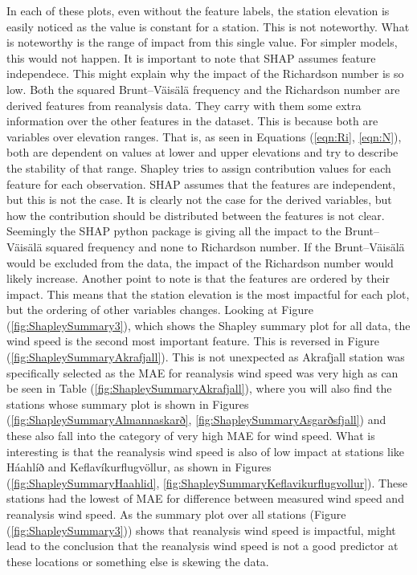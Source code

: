 In each of these plots, even without the feature labels, the station elevation is easily noticed as the value is constant for a station. This is not noteworthy. What is noteworthy is the range of impact from this single value. For simpler models, this would not happen. It is important to note that SHAP assumes feature independece\cite{Salih_2024}. This might explain why the impact of the Richardson number is so low. Both the squared Brunt–Väisälä frequency and the Richardson number are derived features from reanalysis data. They carry with them some extra information over the other features in the dataset. This is because both are variables over elevation ranges. That is, as seen in Equations (\ref{eqn:Ri}, \ref{eqn:N}), both are dependent on values at lower and upper elevations and try to describe the stability of that range. Shapley tries to assign contribution values for each feature for each observation. SHAP assumes that the features are independent, but this is not the case. It is clearly not the case for the derived variables, but how the contribution should be distributed between the features is not clear. Seemingly the SHAP python package is giving all the impact to the Brunt–Väisälä squared frequency and none to Richardson number. If the Brunt–Väisälä would be excluded from the data, the impact of the Richardson number would likely increase. Another point to note is that the features are ordered by their impact. This means that the station elevation is the most impactful for each plot, but the ordering of other variables changes. Looking at Figure (\ref{fig:ShapleySummary3}), which shows the Shapley summary plot for all data, the wind speed is the second most important feature. This is reversed in Figure (\ref{fig:ShapleySummaryAkrafjall}). This is not unexpected as Akrafjall station was specifically selected as the MAE for reanalysis wind speed was very high as can be seen in Table (\ref{fig:ShapleySummaryAkrafjall}), where you will also find the stations whose summary plot is shown in Figures (\ref{fig:ShapleySummaryAlmannaskarð}, \ref{fig:ShapleySummaryAsgarðsfjall}) and these also fall into the category of very high MAE for wind speed. What is interesting is that the reanalysis wind speed is also of low impact at stations like Háahlíð and Keflavíkurflugvöllur, as shown in Figures (\ref{fig:ShapleySummaryHaahlid}, \ref{fig:ShapleySummaryKeflavikurflugvollur}). These stations had the lowest of MAE for difference between measured wind speed and reanalysis wind speed. As the summary plot over all stations (Figure (\ref{fig:ShapleySummary3})) shows that reanalysis wind speed is impactful, might lead to the conclusion that the reanalysis wind speed is not a good predictor at these locations or something else is skewing the data.

